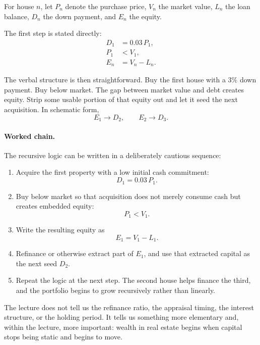 \begin{definition}
For house \(n\), let \(P_n\) denote the purchase price, \(V_n\) the market value, \(L_n\) the loan balance, \(D_n\) the down payment, and \(E_n\) the equity.
\end{definition}

The first step is stated directly:
\begin{align}
D_1 &= 0.03\,P_1,\\
P_1 &< V_1,\\
E_n &= V_n - L_n.
\end{align}

The verbal structure is then straightforward. Buy the first house with a \(3\%\) down payment. Buy below market. The gap between market value and debt creates equity. Strip some usable portion of that equity out and let it seed the next acquisition. In schematic form,
\begin{equation}
E_1 \to D_2,\qquad E_2 \to D_3.
\end{equation}

\paragraph{Worked chain.}
The recursive logic can be written in a deliberately cautious sequence:

\begin{enumerate}
\item Acquire the first property with a low initial cash commitment:
\[
D_1 = 0.03\,P_1.
\]
\item Buy below market so that acquisition does not merely consume cash but creates embedded equity:
\[
P_1 < V_1.
\]
\item Write the resulting equity as
\[
E_1 = V_1 - L_1.
\]
\item Refinance or otherwise extract part of \(E_1\), and use that extracted capital as the next seed \(D_2\).
\item Repeat the logic at the next step. The second house helps finance the third, and the portfolio begins to grow recursively rather than linearly.
\end{enumerate}

The lecture does not tell us the refinance ratio, the appraisal timing, the interest structure, or the holding period. It tells us something more elementary and, within the lecture, more important: wealth in real estate begins when capital stops being static and begins to move.


